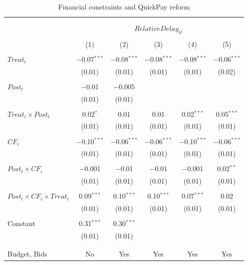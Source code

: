 \documentclass[
]{article}
\begin{document}
\begin{table}[H] \centering 
  \caption{Financial constraints and QuickPay reform} 
  \label{} 
\small 
\begin{tabular}{@{\extracolsep{-2pt}}lccccc} 
\\[-1.8ex]\hline 
\hline \\[-1.8ex] 
\\[-1.8ex] & \multicolumn{5}{c}{$RelativeDelay_{it}$} \\ 
\\[-1.8ex] & (1) & (2) & (3) & (4) & (5)\\ 
\hline \\[-1.8ex] 
 $Treat_i$ & $-$0.07$^{***}$ & $-$0.08$^{***}$ & $-$0.08$^{***}$ & $-$0.08$^{***}$ & $-$0.06$^{***}$ \\ 
  & (0.01) & (0.01) & (0.01) & (0.01) & (0.02) \\ 
  & & & & & \\ 
 $Post_t$ & $-$0.01 & $-$0.005 &  &  &  \\ 
  & (0.01) & (0.01) &  &  &  \\ 
  & & & & & \\ 
 $Treat_i \times Post_t$ & 0.02$^{*}$ & 0.01 & 0.01 & 0.02$^{***}$ & 0.05$^{***}$ \\ 
  & (0.01) & (0.01) & (0.01) & (0.01) & (0.01) \\ 
  & & & & & \\ 
 $CF_i$ & $-$0.10$^{***}$ & $-$0.06$^{***}$ & $-$0.06$^{***}$ & $-$0.10$^{***}$ & $-$0.06$^{***}$ \\ 
  & (0.01) & (0.01) & (0.01) & (0.01) & (0.01) \\ 
  & & & & & \\ 
 $Post_t \times CF_i$ & $-$0.001 & $-$0.01 & $-$0.01 & $-$0.001 & 0.02$^{**}$ \\ 
  & (0.01) & (0.01) & (0.01) & (0.01) & (0.01) \\ 
  & & & & & \\ 
 $Post_t \times CF_i \times Treat_i$ & 0.09$^{***}$ & 0.10$^{***}$ & 0.10$^{***}$ & 0.07$^{***}$ & 0.02 \\ 
  & (0.01) & (0.01) & (0.01) & (0.01) & (0.01) \\ 
  & & & & & \\ 
 Constant & 0.31$^{***}$ & 0.30$^{***}$ &  &  &  \\ 
  & (0.01) & (0.01) &  &  &  \\ 
  & & & & & \\ 
\hline \\[-1.8ex] 
Budget, Bids & No & Yes & Yes & Yes & Yes \\ 

\end{tabular}
\end{table}
\end{document}
